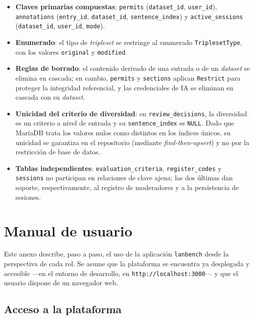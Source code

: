 \begin{itemize}
	\item \textbf{Claves primarias compuestas}: \texttt{permits} (\texttt{dataset\_id},
	      \texttt{user\_id}), \texttt{annotations} (\texttt{entry\_id},
	      \texttt{dataset\_id}, \texttt{sentence\_index}) y \texttt{active\_sessions}
	      (\texttt{dataset\_id}, \texttt{user\_id}, \texttt{mode}).
	\item \textbf{Enumerado}: el tipo de \textit{tripleset} se restringe al enumerado
	      \texttt{TriplesetType}, con los valores \texttt{original} y \texttt{modified}.
	\item \textbf{Reglas de borrado}: el contenido derivado de una entrada o de un
	      \textit{dataset} se elimina en cascada; en cambio, \texttt{permits} y
	      \texttt{sections} aplican \texttt{Restrict} para proteger la integridad
	      referencial, y las credenciales de IA se eliminan en cascada con su
	      \textit{dataset}.
	\item \textbf{Unicidad del criterio de diversidad}: en \texttt{review\_decisions}, la
	      diversidad es un criterio a nivel de entrada y su \texttt{sentence\_index} es
	      \texttt{NULL}. Dado que MariaDB trata los valores nulos como distintos en los
	      índices únicos, su unicidad se garantiza en el repositorio (mediante
	      \textit{find-then-upsert}) y no por la restricción de base de datos.
	\item \textbf{Tablas independientes}: \texttt{evaluation\_criteria},
	      \texttt{register\_codes} y \texttt{sessions} no participan en relaciones de
	      clave ajena; las dos últimas dan soporte, respectivamente, al registro de
	      moderadores y a la persistencia de sesiones.
\end{itemize}

\chapter{Manual de usuario}

Este anexo describe, paso a paso, el uso de la aplicación \texttt{lanbench}
desde la perspectiva de cada rol. Se asume que la plataforma se encuentra ya
desplegada y accesible ---en el entorno de desarrollo, en
\texttt{http://localhost:3000}--- y que el usuario dispone de un navegador web.

\section{Acceso a la plataforma}

